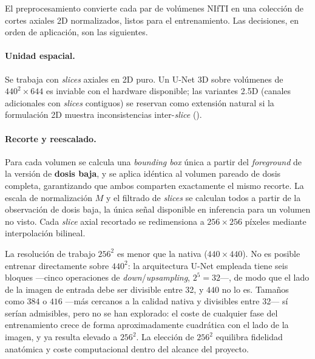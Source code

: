 El preprocesamiento convierte cada par de volúmenes NIfTI en una
colección de cortes axiales 2D normalizados, listos para el
entrenamiento. Las decisiones, en orden de aplicación, son las
siguientes.

\paragraph{Unidad espacial.}
Se trabaja con \textit{slices} axiales en 2D puro. Un U-Net 3D
sobre volúmenes de $440^2 \times 644$ es inviable con el hardware
disponible; las variantes 2.5D (canales adicionales con
\textit{slices} contiguos) se reservan como extensión natural si la
formulación 2D muestra inconsistencias inter-\textit{slice}
().

\paragraph{Recorte y reescalado.}
Para cada volumen se calcula una \textit{bounding box} única a
partir del \textit{foreground} de la versión de \textbf{dosis
baja}, y se aplica idéntica al volumen pareado de dosis completa,
garantizando que ambos comparten exactamente el mismo recorte.
La escala de normalización $M$ y el filtrado de \textit{slices} se calculan todos a partir de la observación de
dosis baja, la única señal disponible en inferencia para un volumen no visto. Cada \textit{slice} axial recortado se
redimensiona a $256 \times 256$ píxeles mediante interpolación bilineal.

La resolución de trabajo $256^2$ es menor que la nativa
($440 \times 440$). No es posible entrenar directamente sobre
$440^2$: la arquitectura U-Net empleada tiene seis bloques —cinco
operaciones de \textit{down}/\textit{upsampling}, $2^5 = 32$—, de
modo que el lado de la imagen de entrada debe ser divisible entre
32, y $440$ no lo es. Tamaños como $384$ o $416$ —más cercanos a
la calidad nativa y divisibles entre 32— sí serían admisibles,
pero no se han explorado: el coste de cualquier fase del
entrenamiento crece de forma aproximadamente cuadrática con el
lado de la imagen, y ya resulta elevado a $256^2$. La elección de
$256^2$ equilibra fidelidad anatómica y coste computacional dentro
del alcance del proyecto.

